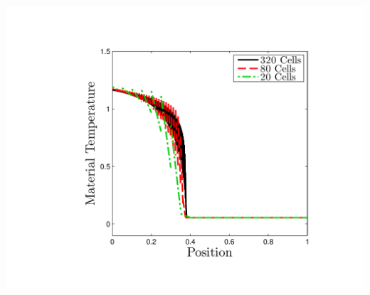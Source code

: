 \documentclass{beamer}
\begin{document}
\begin{frame}
\begin{columns}[t]
\includegraphics[width=\textwidth,trim=1.2in  0.2in 0.75in 0.5in,clip=true]{../chapter6_grey_radtran/Dissertation_Data/Reorder_Blading_Temperature_Full_MultiCell.pdf}
\end{columns}
\end{frame}
\end{document}
